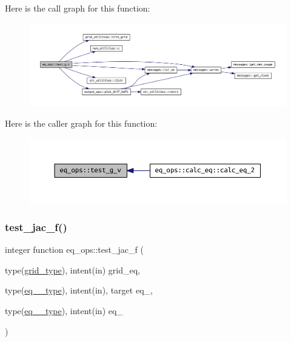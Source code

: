 Here is the call graph for this function\+:
\nopagebreak
\begin{figure}[H]
\begin{center}
\leavevmode
\includegraphics[width=350pt]{namespaceeq__ops_a9811c83477d9d85f7401fd7957a590fc_cgraph}
\end{center}
\end{figure}
Here is the caller graph for this function\+:
\nopagebreak
\begin{figure}[H]
\begin{center}
\leavevmode
\includegraphics[width=350pt]{namespaceeq__ops_a9811c83477d9d85f7401fd7957a590fc_icgraph}
\end{center}
\end{figure}
\mbox{\label{namespaceeq__ops_a05dcd4803b9c7845d3353614c9630c23}} 
\subsubsection{\texorpdfstring{test\+\_\+jac\+\_\+f()}{test\_jac\_f()}}
{\footnotesize\ttfamily integer function eq\+\_\+ops\+::test\+\_\+jac\+\_\+f (\begin{DoxyParamCaption}\item[{type(\hyperlink{structgrid__vars_1_1grid__type}{grid\+\_\+type}), intent(in)}]{grid\+\_\+eq,  }\item[{type(\hyperlink{structeq__vars_1_1eq__1__type}{eq\+\_\+1\+\_\+type}), intent(in), target}]{eq\+\_,  }\item[{type(\hyperlink{structeq__vars_1_1eq__2__type}{eq\+\_\+2\+\_\+type}), intent(in)}]{eq\+\_ }\end{DoxyParamCaption})}



